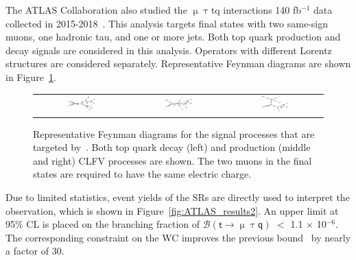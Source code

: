 The \ac{ATLAS} Collaboration also studied the $\upmu\uptau$tq interactions 140 fb$^{-1}$ data collected in 2015-2018~\cite{ATLAS-CONF-2023-001}. This analysis targets final states with two same-sign muons, one hadronic tau, and one or more jets. Both top quark production and decay signals are considered in this analysis. Operators with different Lorentz structures are considered separately. Representative Feynman diagrams are shown in Figure~\ref{fig:ATLAS_FD}. 

\begin{figure}[tbh!]
 \begin{center}
 \begin{tabular}{ccc}
 \includegraphics[width=0.31\textwidth]{figures/Part3/History/ATLAS_TT}&
 \includegraphics[width=0.33\textwidth]{figures/Part3/History/ATLAS_ST1}&
 \includegraphics[width=0.31\textwidth]{figures/Part3/History/ATLAS_ST2}\\
 \end{tabular}
 \caption{Representative Feynman diagrams for the signal processes that are targeted by~\cite{ATLAS-CONF-2023-001}. Both top quark decay (left) and production (middle and right) \ac{CLFV} processes are shown. The two muons in the final states are required to have the same electric charge.}
 \label{fig:ATLAS_FD}
 \end{center}
\end{figure}

Due to limited statistics, event yields of the \acp{SR} are directly used to interpret the observation, which is shown in Figure~\ref{fig:ATLAS_results2}. An upper limit at 95\% \ac{CL} is placed on the branching fraction of $\mathcal{B}(\textsf{t}\rightarrow\upmu\uptau\textsf{q})$ $<$ 1.1 $\times$ 10$^{-6}$. The corresponding constraint on the \ac{WC} improves the previous bound~\cite{Chala:2018agk} by nearly a factor of 30.

